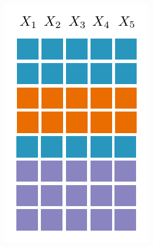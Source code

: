 \documentclass[final]{beamer}
\begin{document}
\begin{frame}{}
\begin{textblock}{60}
\begin{minipage}[t]{4.4874cm}
      \includegraphics[width=\linewidth]{figures/grid-1}
    \end{minipage}\hspace{30pt}
\end{textblock}
\end{frame}
\end{document}
